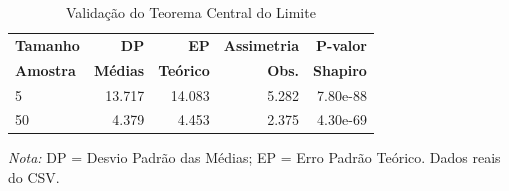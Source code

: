 \begin{table}[H]
\centering
\footnotesize
\caption{Validação do Teorema Central do Limite}
\label{tab:tcl_resultados}
\begin{tabular}{|l|r|r|r|r|}
\hline
\textbf{Tamanho} & \textbf{DP} & \textbf{EP} & \textbf{Assimetria} & \textbf{P-valor} \\
\textbf{Amostra} & \textbf{Médias} & \textbf{Teórico} & \textbf{Obs.} & \textbf{Shapiro} \\
\hline
5 & 13.717 & 14.083 & 5.282 & 7.80e-88 \\
50 & 4.379 & 4.453 & 2.375 & 4.30e-69 \\
\hline
\end{tabular}
\begin{flushleft}
\footnotesize \textit{Nota:} DP = Desvio Padrão das Médias; EP = Erro Padrão Teórico. Dados reais do CSV.
\end{flushleft}
\end{table}